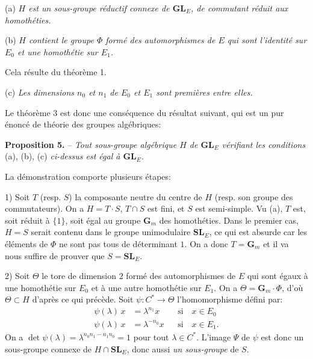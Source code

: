 (a) \textit{$H$ est un sous-groupe réductif connexe de $\mathbf{GL}_E$, de commutant réduit aux homothéties.}

(b) \textit{$H$ contient le groupe $\varPhi$ formé des automorphismes de $E$ qui sont l’identité sur $E_0$ et une homothétie sur $E_1$.}

Cela résulte du théorème 1.

(c) \textit{Les dimensions $n_0$ et $n_1$ de $E_0$ et $E_1$ sont premières entre elles.}

Le théorème 3 est donc une conséquence du résultat suivant, qui est un pur énoncé de théorie des groupes algébriques:

\textbf{Proposition 5.} -- \textit{Tout sous-groupe algébrique $H$ de $\mathbf{GL}_E$ vérifiant les conditions} (a), (b), (c) \textit{ci-dessus est égal à $\mathbf{GL}_E$.}

La démonstration comporte plusieurs étapes:

1) Soit $T$ (resp. $S$) la composante neutre du centre de $H$ (resp. son groupe des commutateurs). On a $H=T\cdot S$, $T\cap S$ est fini, et $S$ est semi-simple. Vu (a), $T$ est, soit réduit à $\{1\}$, soit égal au groupe $\mathbf{G}_m$ des homothéties. Dans le premier cas, $H=S$ serait contenu dans le groupe unimodulaire $\mathbf{SL}_E$, ce qui est absurde car les éléments de $\varPhi$ ne sont pas tous de déterminant $1$. On a donc $T=\mathbf{G}_m$ et il va nous suffire de prouver que $S=\mathbf{SL}_E$.

2) Soit $\varTheta$ le tore de dimension $2$ formé des automorphismes de $E$ qui sont égaux à une homothétie sur $E_0$ et à une autre homothétie sur $E_1$. On a $\varTheta=\mathbf{G}_m\cdot\varPhi$, d’où $\varTheta\subset H$ d’après ce qui précède. Soit $\psi:C^*\to\varTheta$ l’homomorphisme défini par:
\[
\begin{aligned}
\psi(\lambda)\,x&=\lambda^{n_1}x &&\text{si}\quad x\in E_0\\
\psi(\lambda)\,x&=\lambda^{-n_0}x &&\text{si}\quad x\in E_1.
\end{aligned}
\]
On a $\det\psi(\lambda)=\lambda^{n_0n_1-n_1n_0}=1$ pour tout $\lambda\in C^*$. L’image $\varPsi$ de $\psi$ est donc un sous-groupe connexe de $H\cap\mathbf{SL}_E$, donc aussi \textit{un sous-groupe} de $S$.


